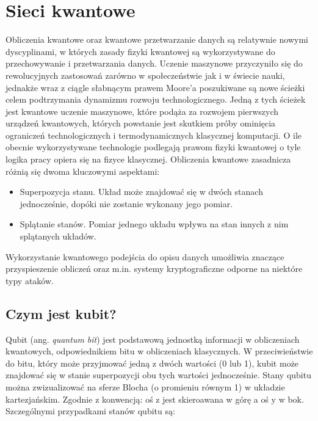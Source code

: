 \newpage
\section{Sieci kwantowe}
Obliczenia kwantowe oraz kwantowe przetwarzanie danych są relatywnie nowymi dyscyplinami, w których zasady fizyki kwantowej są wykorzystywane do przechowywanie i przetwarzania danych. \cite{Nakahara2013}
Uczenie maszynowe przyczyniło się do rewolucyjnych zastosowań zarówno w społeczeństwie jak i w świecie nauki, jednakże wraz z ciągle słabnącym prawem Moore’a poszukiwane są nowe ścieżki celem podtrzymania dynamizmu rozwoju technologicznego. Jedną z tych ścieżek jest kwantowe uczenie maszynowe, które podąża za rozwojem pierwszych urządzeń kwantowych, których powstanie jest skutkiem próby ominięcia ograniczeń technologicznych i termodynamicznych klasycznej komputacji.\cite{training_deep_quantum_nn}
O ile obecnie wykorzystywane technologie podlegają prawom fizyki kwantowej o tyle logika pracy opiera się na fizyce klasycznej. 
Obliczenia kwantowe zasadnicza różnią się dwoma kluczowymi aspektami:
\begin{itemize}
    \item Superpozycja stanu. Układ może znajdować się w dwóch stanach jednocześnie, dopóki nie zostanie wykonany jego pomiar.
    \item Splątanie stanów. Pomiar jednego układu wpływa na stan innych z nim splątanych układów.
\end{itemize}

Wykorzystanie kwantowego podejścia do opisu danych umożliwia znaczące przyspieszenie obliczeń oraz m.in. systemy kryptograficzne odporne na niektóre typy ataków. \cite{Nakahara2013}

\subsection{Czym jest kubit?}\cite{quantum_intro}
Qubit (ang. \textit{quantum bit}) jest podstawową jednostką informacji w obliczeniach kwantowych, odpowiednikiem bitu w obliczeniach klasycznych. W przeciwieństwie do bitu, który może przyjmować jedną z dwóch wartości (0 lub 1), kubit może znajdować się w stanie superpozycji obu tych wartości jednocześnie. Stany qubitu można zwizualizować na sferze Blocha (o promieniu równym 1) w układzie kartezjańskim. Zgodnie z konwencją: oś z jest skieroawana w górę a oś y w bok.
Szczególnymi przypadkami stanów qubitu są:


